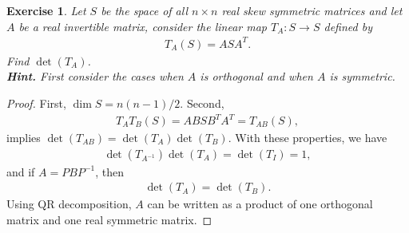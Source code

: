 \documentclass[11pt]{book}
\newtheorem{exercise}{Exercise}[section]
\theoremstyle{definition}
\numberwithin{equation}{chapter}
\begin{document}
\medskip

\begin{exercise}{\rm *}
Let $S$ be the space of all $n \times n$ real skew symmetric matrices and let $A$ be a real invertible matrix, consider the linear map $T_A: S \to S$ defined by 
\begin{align*}
    T_A(S) = ASA^T.
\end{align*}
Find $\det \left(T_A\right)$. \\
{\bf Hint.} First consider the cases when $A$ is orthogonal and when $A$ is symmetric.
\end{exercise}
\begin{proof}
First, $\dim S = n(n-1)/2$. Second, 
\begin{align*}
    T_A T_B (S) = A B S B^T A^T = T_{AB}(S),
\end{align*}
implies $\det \left(T_{AB}\right) = \det \left(T_A\right) \det \left(T_B\right)$. With these properties, we have
\begin{align*}
    \det \left(T_{A^{-1}}\right) \det \left(T_{A}\right) = \det \left(T_{I}\right) = 1,
\end{align*}
and if $A = P B P^{-1}$, then 
\begin{align*}
    \det \left(T_{A}\right) = \det \left(T_{B}\right).
\end{align*}
Using QR decomposition, $A$ can be written as a product of one orthogonal matrix and one real symmetric matrix.
\end{proof}

\medskip
\end{document}
